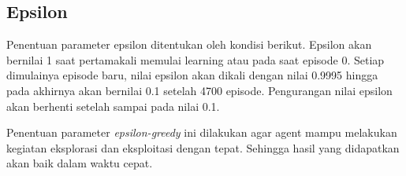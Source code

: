 \subsection{Epsilon}

\begin{table}[H]
	\caption{Hyperparameter epsilon.}
	\label{tb:hyperparameter_epsilon}
\end{table}
Penentuan parameter epsilon ditentukan oleh kondisi berikut. Epsilon akan bernilai 1 saat pertamakali memulai learning atau pada saat episode 0. Setiap dimulainya episode baru, nilai epsilon akan dikali dengan nilai 0.9995 hingga pada akhirnya akan bernilai 0.1 setelah 4700 episode. Pengurangan nilai epsilon akan berhenti setelah sampai pada nilai 0.1.

Penentuan parameter \textit{epsilon-greedy} ini dilakukan agar agent mampu melakukan kegiatan eksplorasi dan eksploitasi dengan tepat. Sehingga hasil yang didapatkan akan baik dalam waktu cepat.
\label{sec:epsilon}

